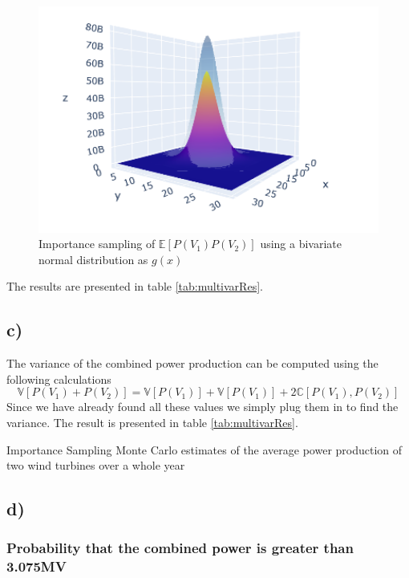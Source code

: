 \documentclass[a4paper]{article}
\begin{document}
\begin{figure}[H]
    \centering
    \includegraphics[width = 1.0\textwidth]{images/mtBruno}
    \caption{Importance sampling of $\mathbb{E}[P(V_1)P(V_2)]$ using a bivariate normal distribution as $g(x)$}
    \label{fig:mtBruno}
\end{figure}


The results are presented in table \ref{tab:multivarRes}.

\subsection*{c)}
The variance of the combined power production can be computed using the following calculations
\begin{equation}
    \mathbb{V}[P(V_1) + P(V_2)] = \mathbb{V}[P(V_1)] + \mathbb{V}[P(V_1)] + 2\mathbb{C}[P(V_1), P(V_2)]
\end{equation}
Since we have already found all these values we simply plug them in to find the variance. The result is presented in table \ref{tab:multivarRes}.

\begin{table}[H]
    \centering
    \caption{Importance Sampling Monte Carlo estimates of the average power production of two wind turbines over a whole year}
    \label{tab:multivarRes}
    
\end{table}

\subsection*{d)}

\subsubsection*{Probability that the combined power is greater than 3.075MV}
\end{document}

